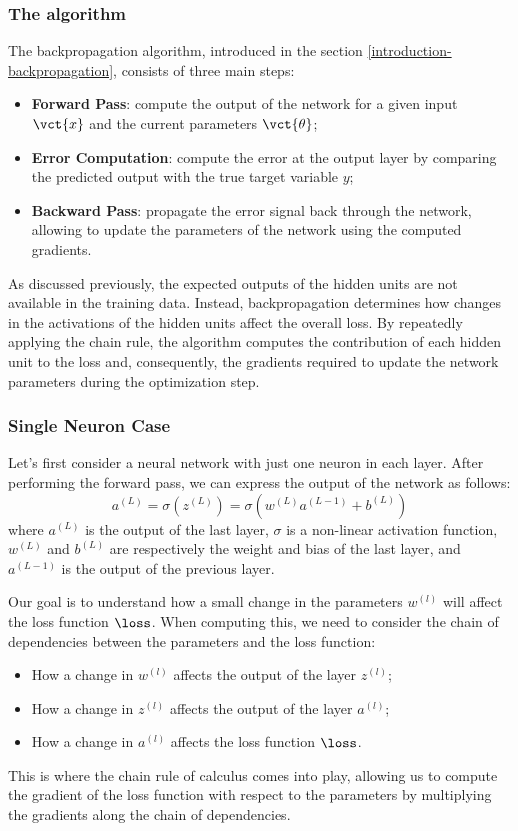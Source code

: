 \subsubsection{The algorithm}
The backpropagation algorithm, introduced in the section \ref{introduction-backpropagation}, consists of three main steps:
\begin{itemize}
    \item \textbf{Forward Pass}: compute the output of the network for a given input $\vct{x}$ and the current parameters $\vct{\theta}$;
    \item \textbf{Error Computation}: compute the error at the output layer by comparing the predicted output with the true target variable $y$;
    \item \textbf{Backward Pass}: propagate the error signal back through the network, allowing to update the parameters of the network using the computed gradients.
\end{itemize}
As discussed previously, the expected outputs of the hidden units are not available in the training data. Instead, backpropagation determines how changes in the activations of the hidden units affect the overall loss. By repeatedly applying the chain rule, the algorithm computes the contribution of each hidden unit to the loss and, consequently, the gradients required to update the network parameters during the optimization step.

\subsubsection{Single Neuron Case}
Let's first consider a neural network with just one neuron in each layer.
After performing the forward pass, we can express the output of the network as follows:
\begin{equation*}
    a^{(L)} = \sigma(z^{(L)}) = \sigma(w^{(L)} a^{(L-1)} + b^{(L)})
\end{equation*}
where $a^{(L)}$ is the output of the last layer, $\sigma$ is a non-linear activation function, 
$w^{(L)}$ and $b^{(L)}$ are respectively the weight and bias of the last layer, and $a^{(L-1)}$ is the output of the previous layer.

Our goal is to understand how a small change in the parameters $w^{(l)}$ will affect the loss function $\loss$.
When computing this, we need to consider the chain of dependencies between the parameters and the loss function:
\begin{itemize}
    \item How a change in $w^{(l)}$ affects the output of the layer $z^{(l)}$;
    \item How a change in $z^{(l)}$ affects the output of the layer $a^{(l)}$;
    \item How a change in $a^{(l)}$ affects the loss function $\loss$.
\end{itemize}
This is where the chain rule of calculus comes into play, allowing us to compute the gradient of the 
loss function with respect to the parameters by multiplying the gradients along the chain of dependencies.


